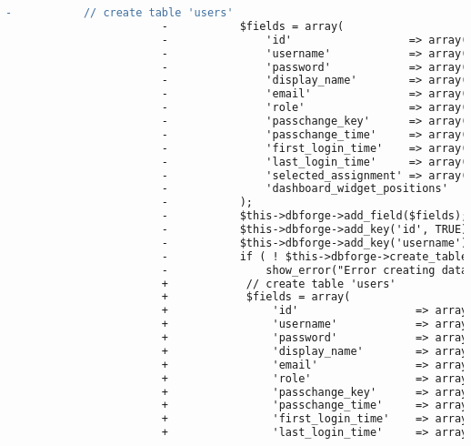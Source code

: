 \begin{lstlisting}[language=diff, caption=Perubahan pada kode Install.php]
						-			// create table 'users'
						-			$fields = array(
						-				'id'                  => array('type' => 'INT', 'constraint' => 11, 'unsigned' => TRUE, 'auto_increment' => TRUE),
						-				'username'            => array('type' => 'VARCHAR', 'constraint' => 20),
						-				'password'            => array('type' => 'VARCHAR', 'constraint' => 100),
						-				'display_name'        => array('type' => 'VARCHAR', 'constraint' => 40, 'default' => ''),
						-				'email'               => array('type' => 'VARCHAR', 'constraint' => 40),
						-				'role'                => array('type' => 'VARCHAR', 'constraint' => 20),
						-				'passchange_key'      => array('type' => 'VARCHAR', 'constraint' => 60, 'default' => ''),
						-				'passchange_time'     => array('type' => $DATETIME, 'null' => TRUE),
						-				'first_login_time'    => array('type' => $DATETIME, 'null' => TRUE),
						-				'last_login_time'     => array('type' => $DATETIME, 'null' => TRUE),
						-				'selected_assignment' => array('type' => 'SMALLINT', 'constraint' => 4, 'unsigned' => TRUE, 'default' => 0),
						-				'dashboard_widget_positions'   => array('type' => 'VARCHAR', 'constraint' => 500, 'default' => ''),
						-			);
						-			$this->dbforge->add_field($fields);
						-			$this->dbforge->add_key('id', TRUE); // PRIMARY KEY
						-			$this->dbforge->add_key('username'); // @todo is this needed?
						-			if ( ! $this->dbforge->create_table('users', TRUE))
						-				show_error("Error creating database table ".$this->db->dbprefix('users'));
						+            // create table 'users'
						+            $fields = array(
						+                'id'                  => array('type' => 'INT', 'constraint' => 11, 'unsigned' => true, 'auto_increment' => true),
						+                'username'            => array('type' => 'VARCHAR', 'constraint' => 20),
						+                'password'            => array('type' => 'VARCHAR', 'constraint' => 100),
						+                'display_name'        => array('type' => 'VARCHAR', 'constraint' => 40, 'default' => ''),
						+                'email'               => array('type' => 'VARCHAR', 'constraint' => 40),
						+                'role'                => array('type' => 'VARCHAR', 'constraint' => 20),
						+                'passchange_key'      => array('type' => 'VARCHAR', 'constraint' => 60, 'default' => ''),
						+                'passchange_time'     => array('type' => $DATETIME, 'null' => true),
						+                'first_login_time'    => array('type' => $DATETIME, 'null' => true),
						+                'last_login_time'     => array('type' => $DATETIME, 'null' => true),

\end{lstlisting}
